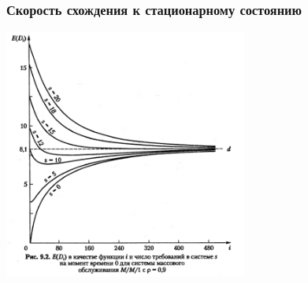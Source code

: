 \documentclass[utf8]{beamer}
\begin{document}
\begin{frame}
\frametitle {Скорость схождения к стационарному состоянию}
\begin{center}
\includegraphics[width=0.6\textwidth]{pic/9-3.png}
\end{center}
\end{frame}
\end{document}
